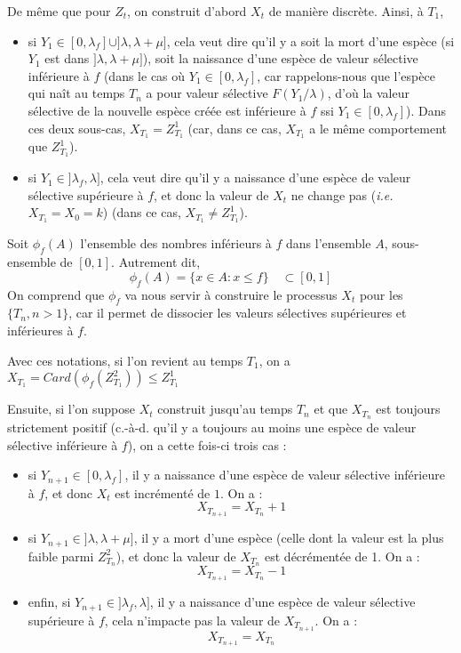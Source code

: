 \documentclass[12pt,a4paper]{article}
\begin{document}
De même que pour $Z_t$, on construit d'abord $X_t$ de manière discrète. Ainsi, à $T_1$, 
\begin{itemize}
    \item si $Y_1 \in [0, \lambda_f] \cup ]\lambda, \lambda + \mu]$, cela veut dire qu'il y a soit la mort d'une espèce (si $Y_1$ est dans $]\lambda, \lambda+\mu]$), soit la naissance d'une espèce de valeur sélective inférieure à $f$ (dans le cas où $Y_1 \in [0, \lambda_f]$, car rappelons-nous que l'espèce qui naît au temps $T_n$ a pour valeur sélective $F(Y_1/\lambda)$, d'où la valeur sélective de la nouvelle espèce créée est inférieure à $f$ ssi $Y_1 \in [0, \lambda_f]$). Dans ces deux sous-cas, $X_{T_1} = Z_{T_1}^1$ (car, dans ce cas, $X_{T_1}$ a le même comportement que $Z_{T_1}^1$).
    
    \item si $Y_1 \in ]\lambda_f, \lambda]$, cela veut dire qu'il y a naissance d'une espèce de valeur sélective supérieure à $f$, et donc  la valeur de $X_t$ ne change pas (\textit{i.e.} $X_{T_1} = X_0 = k$) (dans ce cas, $X_{T_1} \neq Z_{T_1}^1$). 
\end{itemize}

Soit $\phi_f(A)$ l'ensemble des nombres inférieurs à $f$ dans l'ensemble $A$, sous-ensemble de $[0,1]$. Autrement dit, $$\phi_f(A) = \{x \in A : x \leq f\} \quad \subset [0,1] $$ On comprend que $\phi_f$ va nous servir à construire le processus $X_t$ pour les $\{T_n, n>1\}$, car il permet de dissocier les valeurs sélectives supérieures et inférieures à $f$. \par 
Avec ces notations, si l'on revient au temps $T_1$, on a $X_{T_1} = Card(\phi_f(Z_{T_1}^2)) \leq Z_{T_1}^1$

Ensuite, si l'on suppose $X_t$ construit jusqu'au temps $T_n$ et que $X_{T_n}$ est toujours strictement positif (c.-à-d. qu'il y a toujours au moins une espèce de valeur sélective inférieure à $f$), on a cette fois-ci trois cas : 
\begin{itemize}
    \item si $Y_{n+1} \in [0, \lambda_f]$, il y a naissance d'une espèce de valeur sélective inférieure à $f$, et donc $X_t$ est incrémenté de $1$. On a : $$X_{T_{n+1}} = X_{T_n} + 1 $$ 

    \item si $Y_{n+1} \in ]\lambda, \lambda + \mu]$, il y a mort d'une espèce (celle dont la valeur est la plus faible parmi  $Z_{T_n}^2$), et donc la valeur de $X_{T_n}$ est décrémentée de 1. On a : $$X_{T_{n+1}} = X_{T_n} - 1$$
    
    \item enfin, si $Y_{n+1} \in ]\lambda_f, \lambda]$, il y a naissance d'une espèce de valeur sélective supérieure à $f$, cela n'impacte pas la valeur de $X_{T_{n+1}}$. On a : $$X_{T_{n+1}} = X_{T_{n}}$$
\end{itemize}
\end{document}
